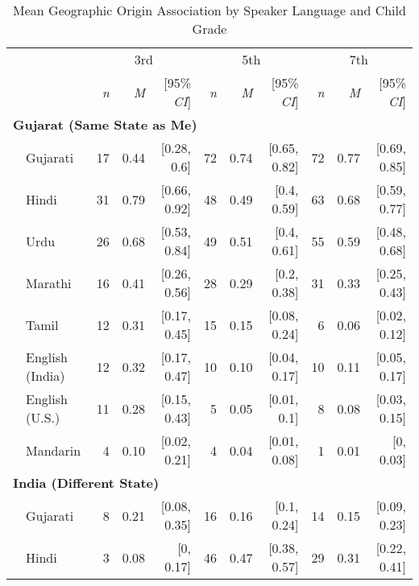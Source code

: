 \begin{table}[t]
 \centering
\caption{Mean Geographic Origin Association by Speaker Language and Child Grade}
\begin{footnotesize}
\renewcommand{\tabcolsep}{0.15cm}
\label{tab:geographic-origins-means}
\begin{tabular}{p{.1in}lrrrrrrrrr}
\toprule
 &  & \multicolumn{3}{c}{3rd} & \multicolumn{3}{c}{5th} & \multicolumn{3}{c}{7th} \\
\cline{3-5} \cline{6-8} \cline{9-11}
&  & \textit{n} & \textit{M} & [95\% \textit{CI}] &  \textit{n} & \textit{M} & [95\% \textit{CI}] &  \textit{n}  & \textit{M} & [95\% \textit{CI}]\\
\midrule
\multicolumn{11}{l}{\textbf{Gujarat (Same State as Me)}}\\
 & Gujarati & 17 & 0.44 & [0.28, 0.6] & 72 & 0.74 & [0.65, 0.82] & 72 & 0.77 & [0.69, 0.85]\\

 & Hindi & 31 & 0.79 & [0.66, 0.92] & 48 & 0.49 & [0.4, 0.59] & 63 & 0.68 & [0.59, 0.77]\\

 & Urdu & 26 & 0.68 & [0.53, 0.84] & 49 & 0.51 & [0.4, 0.61] & 55 & 0.59 & [0.48, 0.68]\\

 & Marathi & 16 & 0.41 & [0.26, 0.56] & 28 & 0.29 & [0.2, 0.38] & 31 & 0.33 & [0.25, 0.43]\\

 & Tamil & 12 & 0.31 & [0.17, 0.45] & 15 & 0.15 & [0.08, 0.24] & 6 & 0.06 & [0.02, 0.12]\\

 & English (India) & 12 & 0.32 & [0.17, 0.47] & 10 & 0.10 & [0.04, 0.17] & 10 & 0.11 & [0.05, 0.17]\\

 & English (U.S.) & 11 & 0.28 & [0.15, 0.43] & 5 & 0.05 & [0.01, 0.1] & 8 & 0.08 & [0.03, 0.15]\\

& Mandarin & 4 & 0.10 & [0.02, 0.21] & 4 & 0.04 & [0.01, 0.08] & 1 & 0.01 & [0, 0.03]\\

\midrule
\multicolumn{11}{l}{\textbf{India (Different State)}}\\
  & Gujarati & 8 & 0.21 & [0.08, 0.35] & 16 & 0.16 & [0.1, 0.24] & 14 & 0.15 & [0.09, 0.23]\\

 & Hindi & 3 & 0.08 & [0, 0.17] & 46 & 0.47 & [0.38, 0.57] & 29 & 0.31 & [0.22, 0.41]\\


\end{tabular}
\end{footnotesize}
\end{table}
